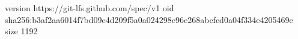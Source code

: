 version https://git-lfs.github.com/spec/v1
oid sha256:b3af2aa6014f7bd09e4d209f5a0a024298e96e268abcfcd0a04f334e4205469e
size 1192
